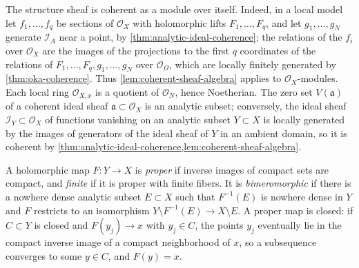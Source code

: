 The structure sheaf is coherent as a module over itself. Indeed, in a local model let $f_1,\ldots,f_q$ be sections of $\mathcal O_X$ with holomorphic lifts $F_1,\ldots,F_q$, and let $g_1,\ldots,g_N$ generate $\mathcal I_A$ near a point, by \cref{thm:analytic-ideal-coherence}; the relations of the $f_i$ over $\mathcal O_X$ are the images of the projections to the first $q$ coordinates of the relations of $F_1,\ldots,F_q,g_1,\ldots,g_N$ over $\mathcal O_\Omega$, which are locally finitely generated by \cref{thm:oka-coherence}. Thus \cref{lem:coherent-sheaf-algebra} applies to $\mathcal O_X$-modules. Each local ring $\mathcal O_{X,x}$ is a quotient of $\mathcal O_N$, hence Noetherian. The zero set $V(\mathfrak a)$ of a coherent ideal sheaf $\mathfrak a\subset\mathcal O_X$ is an analytic subset; conversely, the ideal sheaf $\mathcal I_Y\subset\mathcal O_X$ of functions vanishing on an analytic subset $Y\subset X$ is locally generated by the images of generators of the ideal sheaf of $Y$ in an ambient domain, so it is coherent by \cref{thm:analytic-ideal-coherence,lem:coherent-sheaf-algebra}.

A holomorphic map $F\colon Y\to X$ is \emph{proper} if inverse images of compact sets are compact, and \emph{finite} if it is proper with finite fibers. It is \emph{bimeromorphic} if there is a nowhere dense analytic subset $E\subset X$ such that $F^{-1}(E)$ is nowhere dense in $Y$ and $F$ restricts to an isomorphism $Y\setminus F^{-1}(E)\to X\setminus E$. A proper map is closed: if $C\subset Y$ is closed and $F(y_j)\to x$ with $y_j\in C$, the points $y_j$ eventually lie in the compact inverse image of a compact neighborhood of $x$, so a subsequence converges to some $y\in C$, and $F(y)=x$.

